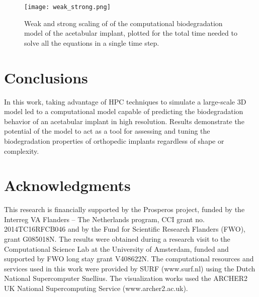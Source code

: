 \begin{figure}[h]
\centering
\medskip
\texttt{[image: weak\_strong.png]}
\caption[Weak and strong scaling of of the acetabular implant model]{Weak and strong scaling of of the computational biodegradation model of the acetabular implant, plotted for the total time needed to solve all the equations in a single time step.} \label{fig:cup_weak_strong}
\end{figure}


\section{Conclusions}

In this work, taking advantage of HPC techniques to simulate a large-scale 3D model led to a computational model capable of predicting the biodegradation behavior of an acetabular implant in high resolution. Results demonstrate the potential of the model to act as a tool for assessing and tuning the biodegradation properties of orthopedic  implants regardless of shape or complexity.

\section{Acknowledgments}

This research is financially supported by the Prosperos project, funded by the Interreg VA Flanders – The Netherlands program, CCI grant no. 2014TC16RFCB046 and by the Fund for Scientific Research Flanders (FWO), grant G085018N. The results were obtained during a research visit to the Computational Science Lab at the University of Amsterdam, funded and supported by FWO long stay grant V408622N. The computational resources and services used in this work were provided by SURF (www.surf.nl) using the Dutch National Supercomputer Snellius. The visualization works used the ARCHER2 UK National Supercomputing Service (www.archer2.ac.uk).







\cleardoublepage
